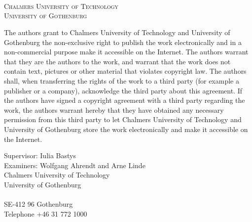 \newpage
\thispagestyle{empty}
\begin{center}

	\textbf{\Large \ambaTitle} \\[1cm]

    {\linespread{1.2}\large
        \StrSubstitute{\ambaAuthors}{,}{\\}
        \\
    }
	
	\vfill 	

	\ambaDepartment \\
	\textsc{Chalmers University of Technology} \\
	\textsc{University of Gothenburg} \\
	\ambaCityCountryYear
\end{center}


\newpage
{The authors grant to Chalmers University of Technology and University of Gothenburg the
non-exclusive right to publish the work electronically and in a non-commercial purpose make it
accessible on the Internet. The authors warrant that they are the authors to the work, and
warrant that the work does not contain text, pictures or other material that violates
copyright law.
The authors shall, when transferring the rights of the work to a third party (for example a
publisher or a company), acknowledge the third party about this agreement. If the authors have
signed a copyright agreement with a third party regarding the work, the authors warrant
hereby that they have obtained any necessary permission from this third party to let Chalmers
University of Technology and University of Gothenburg store the work electronically and make
it accessible on the Internet.}

Supervisor: Iulia Bastys \\
Examiners: Wolfgang Ahrendt and Arne Linde \\[1cm]


Chalmers University of Technology\\
University of Gothenburg\\
\ambaDepartment \\
SE-412 96 Gothenburg\\
Telephone +46 31 772 1000 \setlength{\parskip}{0.5cm}

\vfill
\ambaCityCountryYear
